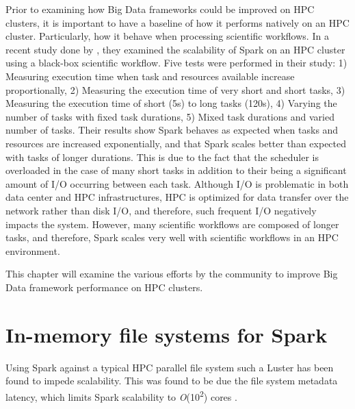 \documentclass{report}
\begin{document}
	Prior to examining how Big Data frameworks could be improved on HPC clusters, it is important to have a baseline of how it performs natively on an HPC cluster. Particularly, how it behave when processing scientific workflows. In a recent study done by \cite{valduriez}, they examined the scalability of Spark on an HPC cluster using a black-box scientific workflow. Five tests were performed in their study: 1) Measuring execution time when task and resources available increase proportionally, 2) Measuring the execution time of very short and short tasks, 3) Measuring the execution time of short (5s) to long tasks (120s), 4) Varying the number of tasks with fixed task durations, 5) Mixed task durations and varied number of tasks. Their results show Spark behaves as expected when tasks and resources are increased exponentially, and that Spark scales better than expected with tasks of longer durations. This is due to the fact that the scheduler is overloaded in the case of many short tasks in addition to their being a significant amount of I/O occurring between each task. Although I/O is problematic in both data center and HPC infrastructures, HPC is optimized for data transfer over the network rather than disk I/O, and therefore, such frequent I/O negatively impacts the system. However, many scientific workflows are composed of longer tasks, and therefore, Spark scales very well with scientific workflows in an HPC environment.
	
	This chapter will examine the various efforts by the community to improve Big Data framework performance on HPC clusters.
	
	\section{In-memory file systems for Spark}
	
	Using Spark against a typical HPC parallel file system such a Luster has been found to impede scalability. This was found to be due the file system metadata latency, which limits Spark scalability to \textit{O}(10\textsuperscript{2}) cores \cite{Chaimov:2016}.
	
	

	
\end{document}
